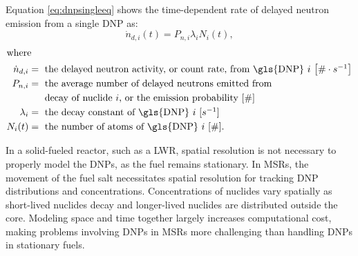 Equation \eqref{eq:dnpsingleeq} shows the time-dependent rate of delayed neutron emission from a single \gls{DNP} as:
\begin{equation}
    \dot{n}_{d, i}(t) = P_{n, i} \lambda_i N_i(t),
    \label{eq:dnpsingleeq}
\end{equation}
\begin{align}
\intertext{where}
\dot{n}_{d, i} &= \mbox{ the delayed neutron activity, or count rate, from \gls{DNP} $i$ $\left[\# \cdot s^{-1}\right]$} \nonumber \\
P_{n, i} &= \mbox{ the average number of delayed neutrons emitted from} \nonumber\\
& \;\;\;\;\;\; \mbox{decay of nuclide $i$, or the emission probability [$\#$]} \nonumber \\
\lambda_i &= \mbox{ the decay constant of \gls{DNP} $i$ $[s^{-1}]$} \nonumber \\
N_i(t) &= \mbox{ the number of atoms of \gls{DNP} $i$ $\left[\#\right]$.} \nonumber
\end{align}


In a solid-fueled reactor, such as a \gls{LWR}, spatial resolution is not necessary to properly model the \glspl{DNP}, as the fuel remains stationary.
In \glspl{MSR}, the movement of the fuel salt necessitates spatial resolution for tracking \gls{DNP} distributions and concentrations.
Concentrations of nuclides vary spatially as short-lived nuclides decay and longer-lived nuclides are distributed outside the core.
Modeling space and time together largely increases computational cost, making problems involving \glspl{DNP} in \glspl{MSR} more challenging than handling \glspl{DNP} in stationary fuels.

